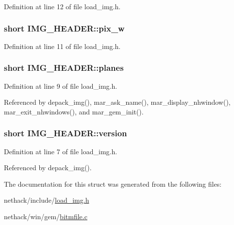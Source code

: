 Definition at line 12 of file load\+\_\+img.\+h.

\hypertarget{structIMG__HEADER_a7f36b605eb7f7ff7f7157fba53a00e0b}{
\subsubsection[{pix\+\_\+w}]{\setlength{\rightskip}{0pt plus 5cm}short I\+M\+G\+\_\+\+H\+E\+A\+D\+E\+R\+::pix\+\_\+w}}\label{structIMG__HEADER_a7f36b605eb7f7ff7f7157fba53a00e0b}


Definition at line 11 of file load\+\_\+img.\+h.

\hypertarget{structIMG__HEADER_ad4657aaf83e1c3a89230a56177bdc7f4}{
\subsubsection[{planes}]{\setlength{\rightskip}{0pt plus 5cm}short I\+M\+G\+\_\+\+H\+E\+A\+D\+E\+R\+::planes}}\label{structIMG__HEADER_ad4657aaf83e1c3a89230a56177bdc7f4}


Definition at line 9 of file load\+\_\+img.\+h.



Referenced by depack\+\_\+img(), mar\+\_\+ask\+\_\+name(), mar\+\_\+display\+\_\+nhwindow(), mar\+\_\+exit\+\_\+nhwindows(), and mar\+\_\+gem\+\_\+init().

\hypertarget{structIMG__HEADER_a1b1d98bc34d00dcc045621d7d108aa33}{
\subsubsection[{version}]{\setlength{\rightskip}{0pt plus 5cm}short I\+M\+G\+\_\+\+H\+E\+A\+D\+E\+R\+::version}}\label{structIMG__HEADER_a1b1d98bc34d00dcc045621d7d108aa33}


Definition at line 7 of file load\+\_\+img.\+h.



Referenced by depack\+\_\+img().



The documentation for this struct was generated from the following files\+:\begin{DoxyCompactItemize}
\item 
nethack/include/\hyperlink{load__img_8h}{load\+\_\+img.\+h}\item 
nethack/win/gem/\hyperlink{bitmfile_8c}{bitmfile.\+c}\end{DoxyCompactItemize}
